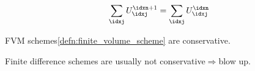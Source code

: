 \begin{defnbox}\nospacing
    \begin{defn}\label{defn:conservative_schemes}
        \begin{align}
          \sum_{\idxj}U_{\idxj}^{\idxn+1}=\sum_{\idxj}U_{\idxj}^{\idxn}
        \end{align}
    \end{defn}
\end{defnbox}
\begin{corbox}\nospacing
    \begin{cor}\label{cor:fvs_are_conservative}
        FVM schemes\cref{defn:finite_volume_scheme} are conservative.
    \end{cor}
\end{corbox}
\begin{notebox}[Note]\nospacing
    Finite difference schemes are usually not conservative$\Rightarrow$blow up.
\end{notebox}

